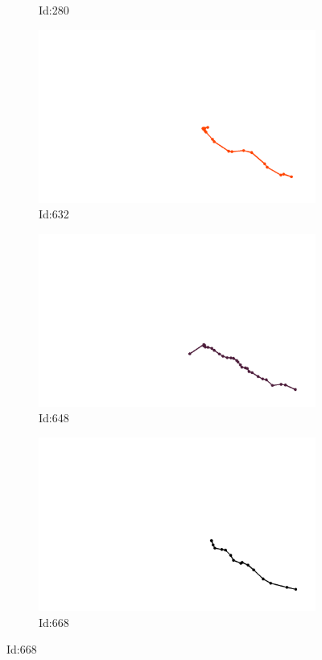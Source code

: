 \documentclass[12pt,twoside]{report}
\begin{document}
\begin{figure}
\begin{subfigure}[b]{0.20\textwidth}
\caption{Id:280}
\end{subfigure}
\begin{subfigure}[b]{0.20\textwidth}
\centering
\includegraphics[width=\textwidth]{../../trajectories/632.png}
\caption{Id:632}
\end{subfigure}
\begin{subfigure}[b]{0.20\textwidth}
\centering
\includegraphics[width=\textwidth]{../../trajectories/648.png}
\caption{Id:648}
\end{subfigure}
\begin{subfigure}[b]{0.20\textwidth}
\centering
\includegraphics[width=\textwidth]{../../trajectories/668.png}
\caption{Id:668}
\end{subfigure}
\end{figure}
\end{document}
